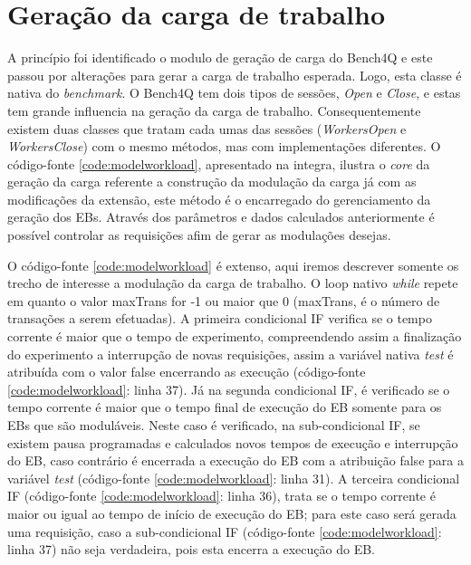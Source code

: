 \section{Geração da carga de trabalho}
A princípio foi identificado o modulo de geração de carga do Bench4Q e este passou por alterações para gerar a carga de trabalho esperada. Logo, esta classe é nativa do \textit{benchmark}. O Bench4Q tem dois tipos de sessões, \textit{Open} e \textit{Close}, e estas tem grande influencia na geração da carga de trabalho. Consequentemente existem duas classes que tratam cada umas das sessões (\textit{WorkersOpen} e \textit{WorkersClose}) com o mesmo métodos, mas com implementações diferentes.
O código-fonte \ref{code:modelworkload}, apresentado na integra, ilustra o \textit{core} da geração da carga referente a construção da modulação da carga já com as modificações da extensão, este método é o encarregado do gerenciamento da geração dos EBs. Através dos parâmetros e dados calculados anteriormente é possível controlar as requisições afim de gerar as modulações desejas.

O código-fonte \ref{code:modelworkload} é extenso, aqui iremos descrever somente os trecho de interesse a modulação da carga de trabalho. O loop nativo \textit{while} repete em quanto o valor \textsf{maxTrans} for -1 ou maior que 0 (\textsf{maxTrans}, é o número de transações a serem efetuadas). A primeira condicional IF verifica se o tempo corrente é maior que o tempo de experimento, compreendendo assim a finalização do experimento a interrupção de novas requisições, assim a variável nativa \textit{test} é atribuída com o valor false encerrando as execução (código-fonte \ref{code:modelworkload}: linha 37). Já na segunda condicional IF, é verificado se o tempo corrente é maior que o tempo final de execução do EB somente para os EBs que são moduláveis. Neste caso é verificado, na sub-condicional IF, se existem pausa programadas e calculados novos tempos de execução e interrupção do EB, caso contrário é encerrada a execução do EB com a atribuição false para a variável \textit{test} (código-fonte \ref{code:modelworkload}: linha 31). A terceira condicional IF (código-fonte \ref{code:modelworkload}: linha 36), trata se o tempo corrente é maior ou igual ao tempo de início de execução do EB; para este caso será gerada uma requisição, caso a sub-condicional IF (código-fonte \ref{code:modelworkload}: linha 37) não seja verdadeira, pois esta encerra a execução do EB.


